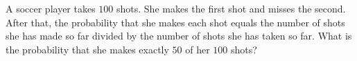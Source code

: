 A soccer player takes $100$ shots. She makes the first shot and misses the second. After that, the probability that she makes each shot equals the number of shots she has made so far divided by the number of shots she has taken so far. What is the probability that she makes exactly $50$ of her $100$ shots?
